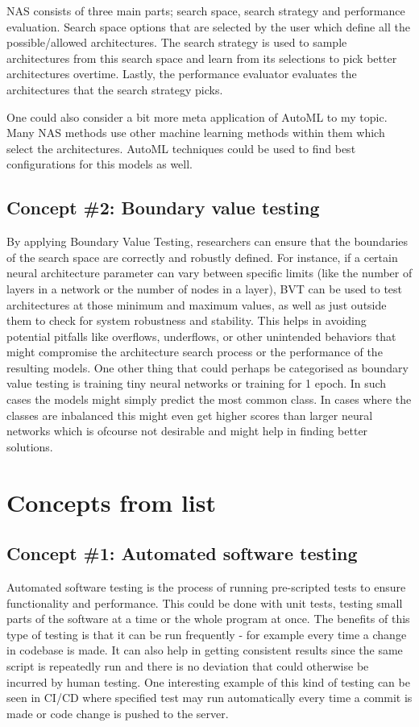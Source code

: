 \documentclass[11pt,a4paper]{article}
\begin{document}
NAS consists of three main parts; search space, search strategy and performance evaluation. Search space options that are selected by the user which define all the possible/allowed architectures. The search strategy is used to sample architectures from this search space and learn from its selections to pick better architectures overtime. Lastly, the performance evaluator evaluates the architectures that the search strategy picks.

One could also consider a bit more meta application of AutoML to my topic. Many NAS methods use other machine learning methods within them which select the architectures. AutoML techniques could be used to find best configurations for this models as well.

\subsection*{Concept \#2: Boundary value testing}
By applying Boundary Value Testing, researchers can ensure that the boundaries of the search space are correctly and robustly defined. For instance, if a certain neural architecture parameter can vary between specific limits (like the number of layers in a network or the number of nodes in a layer), BVT can be used to test architectures at those minimum and maximum values, as well as just outside them to check for system robustness and stability. This helps in avoiding potential pitfalls like overflows, underflows, or other unintended behaviors that might compromise the architecture search process or the performance of the resulting models. One other thing that could perhaps be categorised as boundary value testing is training tiny neural networks or training for 1 epoch. In such cases the models might simply predict the most common class. In cases where the classes are inbalanced this might even get higher scores than larger neural networks which is ofcourse not desirable and might help in finding better solutions.


\section*{Concepts from list}
\subsection*{Concept \#1: Automated software testing}
Automated software testing is the process of running pre-scripted tests to ensure functionality and performance. This could be done with unit tests, testing small parts of the software at a time or the whole program at once. The benefits of this type of testing is that it can be run frequently - for example every time a change in codebase is made. It can also help in getting consistent results since the same script is repeatedly run and there is no deviation that could otherwise be incurred by human testing. One interesting example of this kind of testing can be seen in CI/CD where specified test may run automatically every time a commit is made or code change is pushed to the server.
\end{document}
